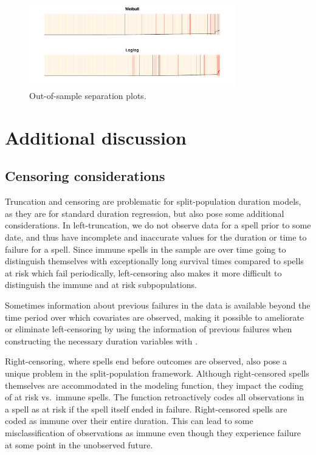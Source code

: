 \begin{figure}[htbp!]
\begin{center}
\includegraphics[width=0.8\textwidth]{graphics/oos-sepplots.pdf}
\caption{Out-of-sample separation plots.}
\label{oos-sepplots}
\end{center}
\end{figure}

\section{Additional discussion}

\subsection{Censoring considerations}

Truncation and censoring are problematic for split-population duration
models, as they are for standard duration regression, but also pose some
additional considerations. In left-truncation, we do not observe data
for a spell prior to some date, and thus have incomplete and inaccurate
values for the duration or time to failure for a spell. Since immune
spells in the sample are over time going to distinguish themselves with
exceptionally long survival times compared to spells at risk which fail
periodically, left-censoring also makes it more difficult to distinguish
the immune and at risk subpopulations.

Sometimes information about previous failures in the data is available
beyond the time period over which covariates are observed, making it
possible to ameliorate or eliminate left-censoring by using the
information of previous failures when constructing the necessary
duration variables with .

Right-censoring, where spells end before outcomes are observed, also
pose a unique problem in the split-population framework. Although
right-censored spells themselves are accommodated in the modeling
function, they impact the coding of at risk vs.~immune spells. The
 function retroactively codes all observations in
a spell as at risk if the spell itself ended in failure. Right-censored
spells are coded as immune over their entire duration. This can lead to
some misclassification of observations as immune even though they
experience failure at some point in the unobserved future.

